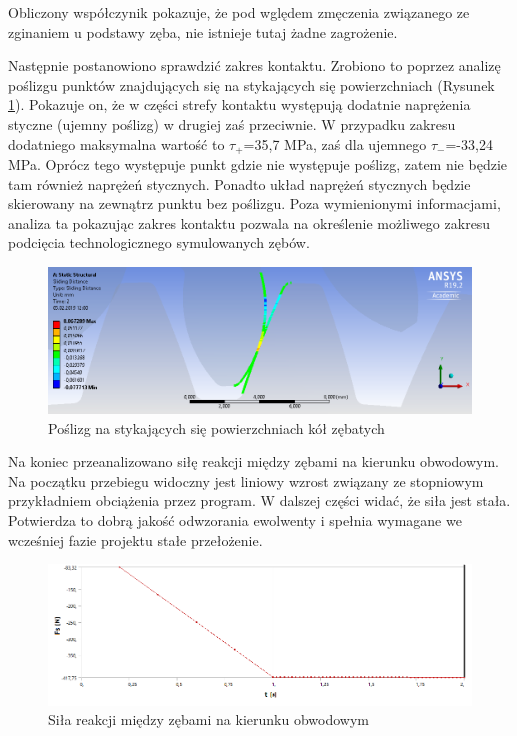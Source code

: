 Obliczony współczynik pokazuje, że pod wględem zmęczenia związanego ze zginaniem u podstawy zęba, nie istnieje tutaj żadne zagrożenie.

Następnie postanowiono sprawdzić zakres kontaktu. 
Zrobiono to poprzez analizę poślizgu punktów znajdujących się na stykających się powierzchniach (Rysunek \ref{fig::zakres_kontaktu}). 
Pokazuje on, że w części strefy kontaktu występują dodatnie naprężenia styczne (ujemny poślizg) w drugiej zaś przeciwnie.
W przypadku zakresu dodatniego maksymalna wartość to $\tau_+$=35,7 MPa, zaś dla ujemnego $\tau_-$=-33,24 MPa.
Oprócz tego występuje punkt gdzie nie występuje poślizg, zatem nie będzie tam również naprężeń stycznych.
Ponadto układ naprężeń stycznych będzie skierowany na zewnątrz punktu bez poślizgu.
Poza wymienionymi informacjami, analiza ta pokazując zakres kontaktu pozwala na określenie możliwego zakresu podcięcia technologicznego symulowanych zębów.


\begin{figure}[th]
	\centering
	\includegraphics[width=0.9\linewidth]{Obliczenia/zakres_kontaktu}
	\caption{Poślizg na stykających się powierzchniach kół zębatych} 
	\label{fig::zakres_kontaktu}
\end{figure}

Na koniec przeanalizowano siłę reakcji między zębami na kierunku obwodowym.
Na początku przebiegu widoczny jest liniowy wzrost związany ze stopniowym przykładniem obciążenia przez program.
W dalszej części widać, że siła jest stała.
Potwierdza to dobrą jakość odwzorania ewolwenty i spełnia wymagane we wcześniej fazie projektu stałe przełożenie.

\begin{figure}[th]
	\centering
	\includegraphics[width=0.9\linewidth]{Obliczenia/sila_reakcji_obwodowa_w_zebie}
	\caption{Siła reakcji między zębami na kierunku obwodowym} 
	\label{fig::sila_obwodowa}
\end{figure}

